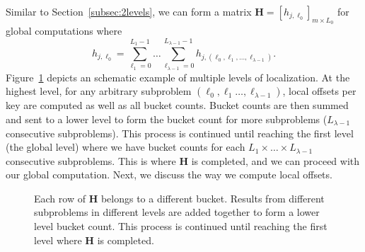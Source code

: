 Similar to Section~\ref{subsec:2levels}, we can form a matrix $\mathbf{H} = [h_{j,\ell_0}]_{m\times L_0}$ for global computations where
\begin{equation}
h_{j,\ell_0} = \sum_{\ell_1 = 0}^{L_1-1}\dots\sum_{\ell_{\lambda-1} = 0}^{L_{\lambda-1}-1} h_{j, (\ell_0, \ell_1,\dots,\ell_{\lambda-1})}.
\end{equation}
Figure~\ref{fig:localization_matrix} depicts an schematic example of multiple levels of localization.
At the highest level, for any arbitrary subproblem $(\ell_0,\ell_1\dots,\ell_{\lambda-1})$, local offsets per key are computed as well as all bucket counts. Bucket counts are then summed and sent to a lower level to form the bucket count for more subproblems ($L_{\lambda-1}$ consecutive subproblems). This process is continued until reaching the first level (the global level) where we have bucket counts for each $L_1\times\dots\times L_{\lambda-1}$ consecutive subproblems. This is where $\mathbf{H}$ is completed, and we can proceed with our global computation. Next, we discuss the way we compute local offsets.

\begin{figure}
  \centering
  
  \caption{Each row of $\mathbf{H}$ belongs to a different bucket. Results from different subproblems in different levels are added together to form a lower level bucket count. This process is continued until reaching the first level where $\mathbf{H}$ is completed.\label{fig:localization_matrix}}
\end{figure}

